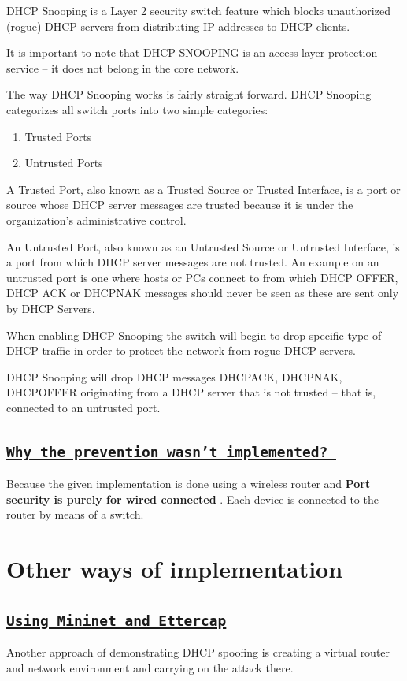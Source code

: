 \documentclass[12pt]{article}
\begin{document}
DHCP Snooping is a Layer 2 security switch feature which blocks unauthorized (rogue) DHCP servers from distributing IP addresses to DHCP clients. 

It is important to note that DHCP SNOOPING is an access layer protection service – it does not belong in the core network.

The way DHCP Snooping works is fairly straight forward. DHCP Snooping categorizes all switch ports into two simple categories:

\begin{enumerate}
    \item Trusted Ports
    \item Untrusted Ports
\end{enumerate}

A Trusted Port, also known as a Trusted Source or Trusted Interface, is a port or source whose DHCP server messages are trusted because it is under the organization’s administrative control. 

An Untrusted Port, also known as an Untrusted Source or Untrusted Interface, is a port from which DHCP server messages are not trusted. An example on an untrusted port is one where hosts or PCs connect to from which DHCP OFFER, DHCP ACK or DHCPNAK messages should never be seen as these are sent only by DHCP Servers.

When enabling DHCP Snooping the switch will begin to drop specific type of DHCP traffic in order to protect the network from rogue DHCP servers. 

DHCP Snooping will drop DHCP messages DHCPACK, DHCPNAK, DHCPOFFER originating from a DHCP server that is not trusted – that is, connected to an untrusted port.

\subsection{\texttt{\underline{Why the prevention wasn't implemented? }}}

Because the given implementation is done using a wireless router and \textbf{Port security is purely for wired connected }. Each device is connected to the router by means of a switch.

\newpage
\section{Other ways of implementation}

\subsection{\texttt{\underline{Using Mininet and Ettercap} }}
Another approach of demonstrating DHCP spoofing is creating a virtual router and network environment and carrying on the attack there.
\end{document}
